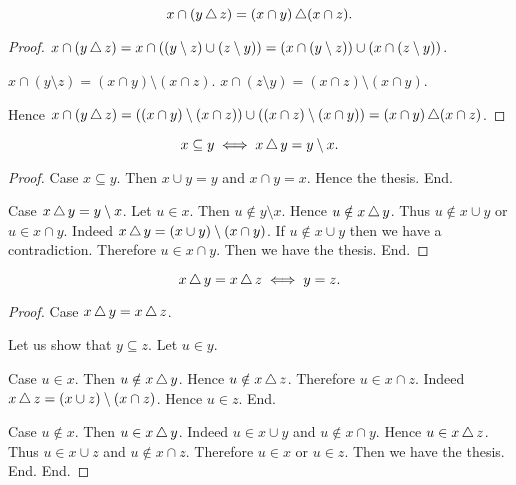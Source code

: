 \documentclass[../../sets-and-functions.ftl.tex]{subfiles}
\begin{document}
\begin{forthel}
    \begin{proposition}[SF 01 04 751668]
      \[ x \cap (y \mathop{\triangle} z) = (x \cap y) \mathop{\triangle} (x \cap z). \]
    \end{proposition}
    \begin{proof}
      $x \cap (y \mathop{\triangle} z) = x \cap ((y \setminus z) \cup (z \setminus y)) =
      (x \cap (y \setminus z)) \cup (x \cap (z \setminus y))$.

      $x \cap (y \setminus z) = (x \cap y) \setminus (x \cap z)$.
      $x \cap (z \setminus y) = (x \cap z) \setminus (x \cap y)$.

      Hence $x \cap (y \mathop{\triangle} z) = ((x \cap y) \setminus (x \cap z)) \cup
      ((x \cap z) \setminus (x \cap y)) = (x \cap y) \mathop{\triangle} (x \cap z)$.
    \end{proof}


    \begin{proposition}[SF 01 04 420961]
      \[ x \subseteq y \iff x \mathop{\triangle} y = y \setminus x. \]
    \end{proposition}
    \begin{proof}
      Case $x \subseteq y$.
        Then $x \cup y = y$ and $x \cap y = x$.
        Hence the thesis.
      End.

      Case $x \mathop{\triangle} y = y \setminus x$.
        Let $u \in x$.
        Then $u \notin y \setminus x$.
        Hence $u \notin x \mathop{\triangle} y$.
        Thus $u \notin x \cup y$ or $u \in x \cap y$.
        Indeed $x \mathop{\triangle} y = (x \cup y) \setminus (x \cap y)$.
        If $u \notin x \cup y$ then we have a contradiction.
        Therefore $u \in x \cap y$.
        Then we have the thesis.
      End.
    \end{proof}


    \begin{proposition}[SF 01 04 241267]
      \[ x \mathop{\triangle} y = x \mathop{\triangle} z \iff y = z. \]
    \end{proposition}
    \begin{proof}
      Case $x \mathop{\triangle} y = x \mathop{\triangle} z$.

        Let us show that $y \subseteq z$.
          Let $u \in y$.

          Case $u \in x$.
            Then $u \notin x \mathop{\triangle} y$.
            Hence $u \notin x \mathop{\triangle} z$.
            Therefore $u \in x \cap z$.
            Indeed $x \mathop{\triangle} z = (x \cup z) \setminus (x \cap z)$.
            Hence $u \in z$.
          End.

          Case $u \notin x$.
            Then $u \in x \mathop{\triangle} y$.
            Indeed $u \in x \cup y$ and $u \notin x \cap y$.
            Hence $u \in x \mathop{\triangle} z$.
            Thus $u \in x \cup z$ and $u \notin x \cap z$.
            Therefore $u \in x$ or $u \in z$.
            Then we have the thesis.
          End.
        End.


\end{proof}
\end{forthel}
\end{document}
